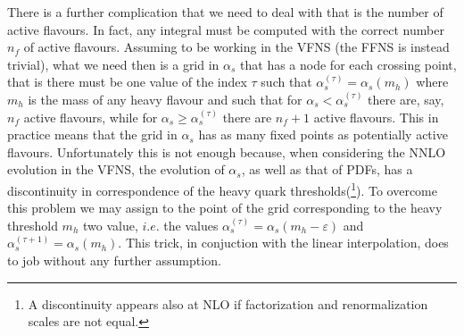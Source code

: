\documentclass[10pt,a4paper]{article}
\begin{document}
There is a further complication that we need to deal with that is the
number of active flavours. In fact, any integral must be computed with
the correct number $n_f$ of active flavours. Assuming to be working
in the VFNS (the FFNS is instead trivial), what we need then is a grid in $\alpha_s$ that has a node
for each crossing point, that is there must be one value of the index
$\tau$ such that $\alpha_s^{(\tau)}=\alpha_s(m_h)$ where $m_h$ is the
mass of any heavy flavour and such that for $\alpha_s<\alpha_s^{(\tau)}$
there are, say, $n_f$ active flavours, while for
$\alpha_s\geq\alpha_s^{(\tau)}$ there are $n_f+1$ active flavours. This in practice means that the grid in
$\alpha_s$ has as many fixed points as potentially active
flavours. Unfortunately this is not enough because, when considering
the NNLO evolution in the VFNS, the evolution of $\alpha_s$, as well as
that of PDFs, has a discontinuity in correspondence of the heavy quark
thresholds(\footnote{A discontinuity appears also at NLO if
  factorization and renormalization scales are not equal.}). To
overcome this problem we may assign to the point of the grid
corresponding to the heavy threshold $m_h$ two value, $i.e.$ the
values $\alpha_s^{(\tau)}=\alpha_s(m_h-\varepsilon)$ and
$\alpha_s^{(\tau+1)}=\alpha_s(m_h)$. This trick, in conjuction with
the linear interpolation, does to job without any further assumption.
\end{document}
